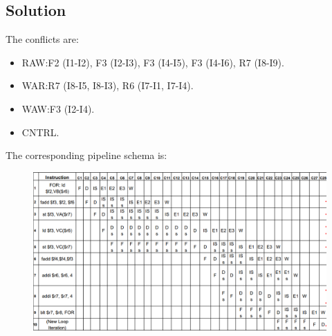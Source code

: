 \subsection*{Solution}
The conflicts are:
\begin{itemize}
\item RAW:\@ F2 (I1-I2), F3 (I2-I3), F3 (I4-I5), F3 (I4-I6), R7 (I8-I9).
\item WAR:\@ R7 (I8-I5, I8-I3), R6 (I7-I1, I7-I4).
\item WAW:\@ F3 (I2-I4).
\item CNTRL.\@
\end{itemize}
The corresponding pipeline schema is: 
\begin{figure}[H]
    \centering
    \includegraphics[width=1\linewidth]{images/pip.png}
\end{figure}